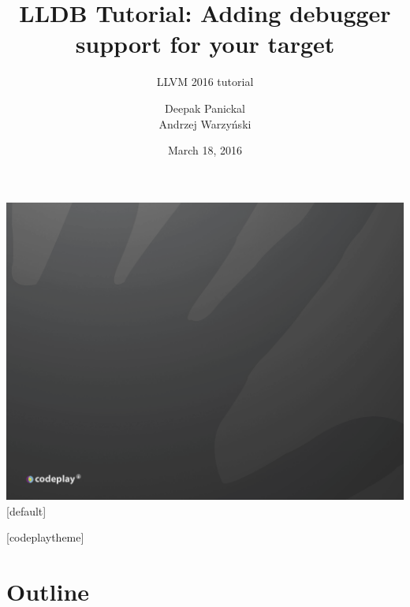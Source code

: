 \documentclass[t]{beamer}
\title{LLDB Tutorial: Adding debugger support for your target}
\subtitle{LLVM 2016 tutorial}
\author{Deepak Panickal \\ Andrzej Warzy\'nski}
\institute{Codeplay Software \\ @codeplaysoft}
\date{March 18, 2016}
\begin{document}
{\includegraphics[width=\paperwidth,height=\paperheight]{dark_background_title.png}}
[default]

\begin{frame}
  \vspace{4ex}
  \titlepage
\end{frame}


[codeplaytheme]

\section*{Outline}
\end{document}
